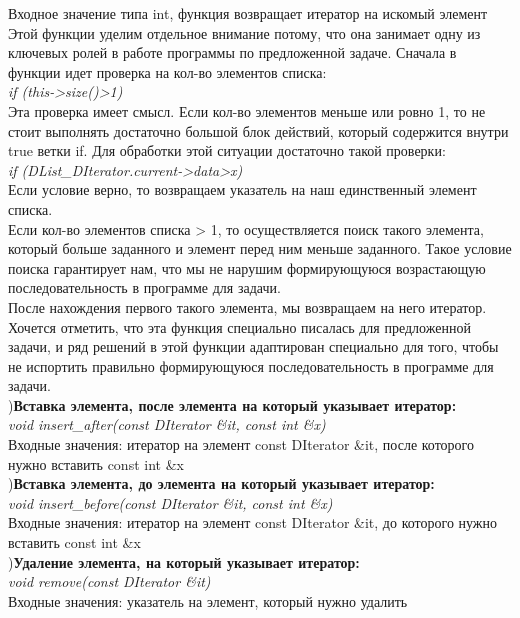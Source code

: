 \documentclass[a4paper]{article}
\begin{document}
{        \hfill\break
    Входное значение типа int, функция возвращает итератор на искомый элемент\\
        \hfill\break
    Этой функции уделим отдельное внимание потому, что она занимает одну из ключевых ролей в работе программы по предложенной задаче.
    Сначала в функции идет проверка на кол-во элементов списка:\\
        \textit{if (this->size()>1)}\\
        \hfill\break
    Эта проверка имеет смысл. Если кол-во элементов меньше или ровно 1, то не стоит выполнять достаточно большой блок действий, который содержится внутри true ветки if. Для обработки этой ситуации достаточно такой проверки:\\
        \hfill\break
        \textit{if (DList\_DIterator.current->data>x)}\\
        \hfill\break                
    Если условие верно, то возвращаем указатель на наш единственный элемент списка.\\
        \hfill\break
    Если кол-во элементов списка > 1, то осуществляется поиск такого элемента, который больше заданного и элемент перед ним меньше заданного. Такое условие поиска гарантирует нам, что мы не нарушим формирующуюся возрастающую последовательность в программе для задачи.\\
    После нахождения первого такого элемента, мы возвращаем на него итератор.\\
        \hfill\break
    Хочется отметить, что эта функция специально писалась для предложенной задачи, и ряд решений в этой функции адаптирован специально для того, чтобы не испортить правильно формирующуюся последовательность в программе для задачи.\\ 
        \hfill\break
        \hfill{}){\bf Вставка элемента, после элемента на который указывает итератор:}\\                                       
        \hfill\break
        \textit{void insert\_after(const DIterator \&it, const int \&x)}\\
        \hfill\break
    Входные значения: итератор на элемент const DIterator \&it, после которого нужно вставить const int \&x\\
        \hfill\break
        \hfill{}){\bf Вставка элемента, до элемента на который указывает итератор:}\\                                       
        \hfill\break
        \textit{void insert\_before(const DIterator \&it, const int \&x)}\\
        \hfill\break
    Входные значения: итератор на элемент const DIterator \&it, до которого нужно вставить const int \&x\\
        \hfill\break
        \hfill{}){\bf Удаление элемента, на который указывает итератор:}\\                                       
        \hfill\break
        \textit{void remove(const DIterator \&it)}\\
        \hfill\break
    Входные значения: указатель на элемент, который нужно удалить\\
                                 
    }
\end{document}
